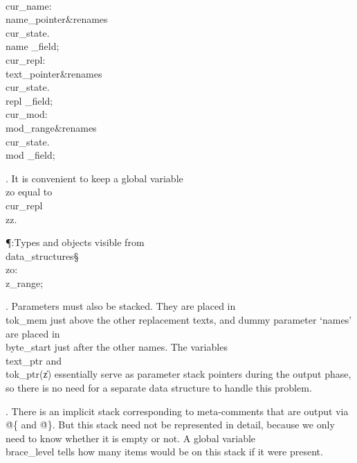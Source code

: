 \\{cur\_name}\?:\?\\{name\_pointer}\8\&{renames}\8\\{cur\_state}\?.\?\\{name%
\_field};\6
\\{cur\_repl}\?:\?\\{text\_pointer}\8\&{renames}\8\\{cur\_state}\?.\?\\{repl%
\_field};\6
\\{cur\_mod}\?:\?\\{mod\_range}\8\&{renames}\8\\{cur\_state}\?.\?\\{mod%
\_field};\par
\fi

. It is convenient to keep a global variable \\{zo} equal to \\{cur\_repl}%
\?\?\\{zz}.

\Y\P\?\4:Types and objects visible from \\{data\_structures}\X\mathrel{+}\S%
\?\6
\\{zo}\?:\?\\{z\_range};\par
\fi

. Parameters must also be stacked. They are placed in \\{tok\_mem} just
above
the other replacement texts, and dummy parameter `names' are placed in
\\{byte\_start} just after the other names. The variables \\{text\_ptr} and
\\{tok\_ptr}\?(\?\|z\?)\? essentially serve as parameter stack pointers during
the output
phase, so there is no need for a separate data structure to handle this
problem.

\fi

. There is an implicit stack corresponding to meta-comments that are output
via \.{@\{} and \.{@\}}. But this stack need not be represented in detail,
because we only need to know whether it is empty or not. A global variable
\\{brace\_level} tells how many items would be on this stack if it were
present.

